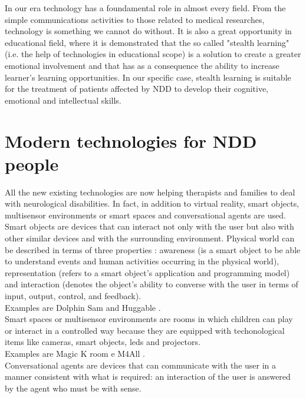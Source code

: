 In our era technology has a foundamental role in almost every field. From the simple communications activities to those related to medical researches, technology is something we cannot do without. It is also a great opportunity in educational field, where it is demonstrated that the so called "stealth learning" (i.e. the help of technologies in educational scope) \cite{Sharp} is a solution to create a greater emotional involvement and that has as a consequence the ability to increase learner's learning opportunities. In our specific case, stealth learning is suitable for the treatment of patients affected by NDD to develop their cognitive, emotional and intellectual skills.
\section{Modern technologies for NDD people}
All the new existing technologies are now helping therapists and families to deal with neurological disabilities. In fact, in addition to virtual reality, smart objects, multisensor environments or smart spaces and conversational agents are used.\\
Smart objects are devices that can interact not only with the user but also with other similar devices and with the surrounding environment. Physical world can be described in terms of three properties \cite{Smart}: awareness (is a smart object to be able to understand events and human activities occurring in the physical world), representation (refers to a smart object's application and programming model) and interaction (denotes the object's ability to converse with the user in terms of input, output, control, and feedback).\\
Examples are Dolphin Sam \cite{Dolphin} and  Huggable \cite{Huggable}. \\
Smart spaces or multisensor environments are rooms in which children can play or interact in a controlled way because they are equipped with techonological items like cameras, smart objects, leds and projectors.
\\
Examples are Magic K room e M4All \cite{M4all}. \\
Conversational agents are devices that can communicate with the user in a manner consistent with what is required: an interaction of the user is answered by the agent who must be with sense.\\
